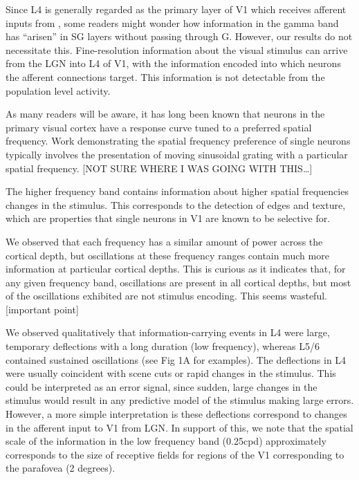 Since \ac{L4} is generally regarded as the primary layer of \ac{V1} which receives afferent inputs from , some readers might wonder how information in the gamma band has ``arisen'' in \ac{SG} layers without passing through \ac{G}. However, our results do not necessitate this. Fine-resolution information about the visual stimulus can arrive from the \ac{LGN} into \ac{L4} of \ac{V1}, with the information encoded into which neurons the afferent connections target. This information is not detectable from the population level activity. 

As many readers will be aware, it has long been known that neurons in the primary visual cortex have a response curve tuned to a preferred spatial frequency. Work demonstrating the spatial frequency preference of single neurons typically involves the presentation of moving sinusoidal grating with a particular spatial frequency. [NOT SURE WHERE I WAS GOING WITH THIS{\dots}]

The higher frequency band contains information about higher spatial frequencies changes in the stimulus. This corresponds to the detection of edges and texture, which are properties that single neurons in \ac{V1} are known to be selective for. 

We observed that each frequency has a similar amount of power across the cortical depth, but oscillations at these frequency ranges contain much more information at particular cortical depths. This is curious as it indicates that, for any given frequency band, oscillations are present in all cortical depths, but most of the oscillations exhibited are not stimulus encoding. This seems wasteful. [important point]

We observed qualitatively that information-carrying events in \ac{L4} were large, temporary deflections with a long duration (low frequency), whereas \acs{L5}/6 contained sustained oscillations (see Fig 1A for examples). The deflections in \ac{L4} were usually coincident with scene cuts or rapid changes in the stimulus. This could be interpreted as an error signal, since sudden, large changes in the stimulus would result in any predictive model of the stimulus making large errors. However, a more simple interpretation is these deflections correspond to changes in the afferent input to \ac{V1} from \ac{LGN}. In support of this, we note that the spatial scale of the information in the low frequency band (0.25cpd) approximately corresponds to the size of receptive fields for regions of the \ac{V1} corresponding to the parafovea (2 degrees).

